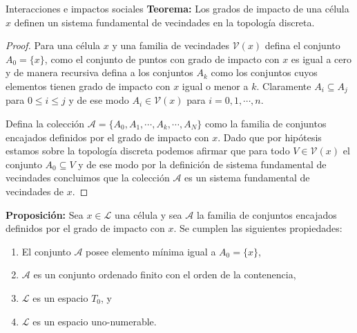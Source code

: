 \documentclass[9pt]{beamer}
\begin{document}
\begin{frame}{Interacciones e impactos sociales}
\textbf{Teorema:} Los grados de impacto de una célula $x$ definen un sistema fundamental de vecindades en la topología discreta.

\begin{proof}
Para una célula $x$ y una familia de vecindades $\mathcal{V}(x)$ defina el conjunto $A_0=\{x\}$, como el conjunto de puntos con grado de impacto con $x$ es igual a cero y de manera recursiva defina a los conjuntos $A_k$ como los conjuntos cuyos elementos tienen grado de impacto con $x$ igual o menor a $k$. Claramente $A_i\subseteq A_j$ para $0\leq i\leq j$ y de ese modo $A_i\in\mathcal{V}(x)$ para $i=0,1,\cdots,n$.

Defina la colección $\mathcal{A}=\{A_0,A_1,\cdots,A_k,\cdots,A_N\}$ como la familia de conjuntos encajados definidos por el grado de impacto con $x$. Dado que por hipótesis estamos sobre la topología discreta podemos afirmar que para todo $V\in\mathcal{V}(x)$ el conjunto $A_0\subseteq V$ y de ese modo por la definición de sistema fundamental de vecindades concluimos que la colección $\mathcal{A}$ es un sistema fundamental de vecindades de $x$.
\end{proof}

\textbf{Proposición:} Sea $x\in\mathcal{L}$ una célula y sea $\mathcal{A}$ la familia de conjuntos encajados definidos por el grado de impacto con $x$. Se cumplen las siguientes propiedades:

\begin{enumerate}
    \item El conjunto $\mathcal{A}$ posee elemento mínima igual a $A_0=\{x\}$,
    \item $\mathcal{A}$ es un conjunto ordenado finito con el orden de la contenencia,
    \item $\mathcal{L}$ es un espacio $T_0$, y
    \item $\mathcal{L}$ es un espacio uno-numerable.
\end{enumerate}
\end{frame}
\end{document}
